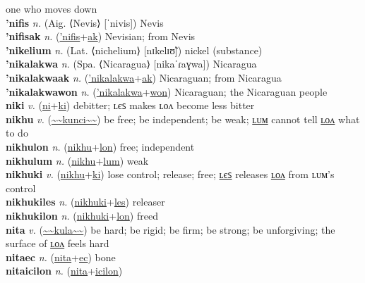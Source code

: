 one who moves down \label{nicekiles} \\
\textbf{'nifis} \textit{n.} (Aig. ⟨Nevis⟩ [ˈnivis])
Nevis \label{'nifis} \\
\textbf{'nifisak} \textit{n.} (\hyperref['nifis]{'nifis}+\hyperref[ak]{ak})
Nevisian; from Nevis \label{'nifisak} \\
\textbf{'nikelium} \textit{n.} (Lat. ⟨nichelium⟩ [nɪkelɪʊ̃])
nickel (substance) \label{'nikelium} \\
\textbf{'nikalakwa} \textit{n.} (Spa. ⟨Nicaragua⟩ [nikaˈɾaɣwa])
Nicaragua \label{'nikalakwa} \\
\textbf{'nikalakwaak} \textit{n.} (\hyperref['nikalakwa]{'nikalakwa}+\hyperref[ak]{ak})
Nicaraguan; from Nicaragua \label{'nikalakwaak} \\
\textbf{'nikalakwawon} \textit{n.} (\hyperref['nikalakwa]{'nikalakwa}+\hyperref[won]{won})
Nicaraguan; the Nicaraguan people \label{'nikalakwawon} \\
\textbf{niki} \textit{v.} (\hyperref[ni]{ni}+\hyperref[ki]{ki})
debitter; ʟєꜱ makes ʟᴏᴧ become less bitter \label{niki} \\
\textbf{nikhu} \textit{v.} (\hyperref[kunci]{\~{}\~{}kunci\~{}\~{}})
be free; be independent; be weak; \hyperref[nikhulum]{ʟᴜᴍ} cannot tell \hyperref[nikhulon]{ʟᴏᴧ} what to do \label{nikhu} \\
\textbf{nikhulon} \textit{n.} (\hyperref[nikhu]{nikhu}+\hyperref[lon]{lon})
free; independent \label{nikhulon} \\
\textbf{nikhulum} \textit{n.} (\hyperref[nikhu]{nikhu}+\hyperref[lum]{lum})
weak \label{nikhulum} \\
\textbf{nikhuki} \textit{v.} (\hyperref[nikhu]{nikhu}+\hyperref[ki]{ki})
lose control; release; free; \hyperref[nikhukiles]{ʟєꜱ} releases \hyperref[nikhukilon]{ʟᴏᴧ} from ʟᴜᴍ's control \label{nikhuki} \\
\textbf{nikhukiles} \textit{n.} (\hyperref[nikhuki]{nikhuki}+\hyperref[les]{les})
releaser \label{nikhukiles} \\
\textbf{nikhukilon} \textit{n.} (\hyperref[nikhuki]{nikhuki}+\hyperref[lon]{lon})
freed \label{nikhukilon} \\
\textbf{nita} \textit{v.} (\hyperref[kula]{\~{}\~{}kula\~{}\~{}})
be hard; be rigid; be firm; be strong; be unforgiving; the surface of \hyperref[nitalon]{ʟᴏᴧ} feels hard \label{nita} \\
\textbf{nitaec} \textit{n.} (\hyperref[nita]{nita}+\hyperref[ec]{ec})
bone \label{nitaec} \\
\textbf{nitaicilon} \textit{n.} (\hyperref[nita]{nita}+\hyperref[icilon]{icilon})
